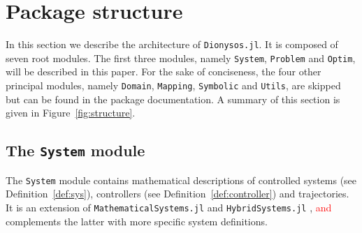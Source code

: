 \documentclass{juliacon}
\begin{document}
\section{Package structure}
\label{sec:package}

In this section we describe the architecture of \texttt{Dionysos.jl}. It is composed of seven root modules. The first three modules, namely \texttt{System}, \texttt{Problem} and \texttt{Optim}, will be described in this paper. For the sake of conciseness, the four other principal modules, namely \texttt{Domain}, \texttt{Mapping}, \texttt{Symbolic} and \texttt{Utils}, are skipped but can be found in the package documentation. A summary of this section is given in Figure~\ref{fig:structure}.

\subsection{The \texttt{System} module}

The \texttt{System} module contains mathematical descriptions of controlled systems (see Definition~\ref{def:sys}), controllers (see Definition~\ref{def:controller}) and trajectories. It is an extension of \texttt{MathematicalSystems.jl} and \texttt{HybridSystems.jl} \cite{BenoitLegat2024}, \textcolor{red}{and} complements the latter with more specific system definitions.

\vskip 6pt
\end{document}
